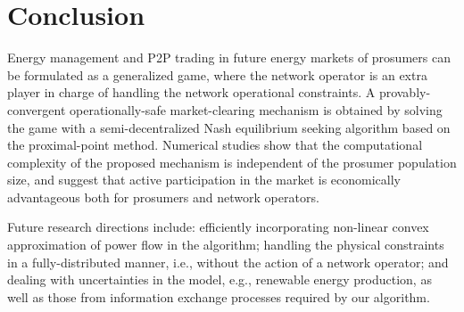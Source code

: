 \documentclass{IEEEtran}  %
\newcommand{\0}{\mathbf{0}}
\newcommand{\1}{\mathbf{1}}
\begin{document}
\section{Conclusion}
Energy management and P2P trading in future energy markets of prosumers can be formulated as a generalized game, where the network operator is an extra player in charge of handling the network operational constraints. A provably-convergent operationally-safe market-clearing mechanism is obtained by solving the game with a semi-decentralized Nash equilibrium seeking algorithm based on the proximal-point method.    
%
Numerical studies show that the computational complexity of the proposed mechanism is independent of the prosumer population size, and suggest that active participation in the market is economically advantageous both for prosumers and network operators.

Future research directions include: efficiently incorporating non-linear convex approximation of power flow in the algorithm; handling the physical constraints in a fully-distributed manner, i.e., without the action of a network operator; and dealing with uncertainties in the model, e.g., renewable energy production, as well as those from information exchange processes required by our algorithm.

\balance



%
\end{document}

